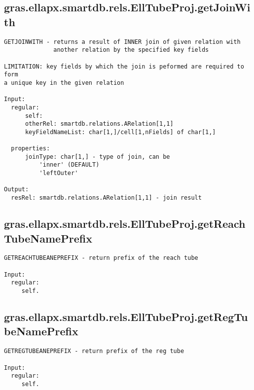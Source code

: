 \subsection{\texorpdfstring{gras.ellapx.smartdb.rels.EllTubeProj.getJoinWith}{getJoinWith}}\label{method:gras.ellapx.smartdb.rels.EllTubeProj.getJoinWith}
\begin{verbatim}
GETJOINWITH - returns a result of INNER join of given relation with
              another relation by the specified key fields

LIMITATION: key fields by which the join is peformed are required to form
a unique key in the given relation

Input:
  regular:
      self:
      otherRel: smartdb.relations.ARelation[1,1]
      keyFieldNameList: char[1,]/cell[1,nFields] of char[1,]

  properties:
      joinType: char[1,] - type of join, can be
          'inner' (DEFAULT)
          'leftOuter'

Output:
  resRel: smartdb.relations.ARelation[1,1] - join result
\end{verbatim}
\subsection{\texorpdfstring{gras.ellapx.smartdb.rels.EllTubeProj.getReachTubeNamePrefix}{getReachTubeNamePrefix}}\label{method:gras.ellapx.smartdb.rels.EllTubeProj.getReachTubeNamePrefix}
\begin{verbatim}
GETREACHTUBEANEPREFIX - return prefix of the reach tube

Input:
  regular:
     self.
\end{verbatim}
\subsection{\texorpdfstring{gras.ellapx.smartdb.rels.EllTubeProj.getRegTubeNamePrefix}{getRegTubeNamePrefix}}\label{method:gras.ellapx.smartdb.rels.EllTubeProj.getRegTubeNamePrefix}
\begin{verbatim}
GETREGTUBEANEPREFIX - return prefix of the reg tube

Input:
  regular:
     self.
\end{verbatim}

